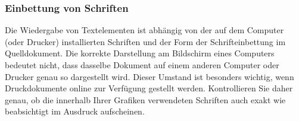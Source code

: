 \subsubsection{Einbettung von Schriften}

Die Wiedergabe von Textelementen ist abhängig von der auf dem
Computer (oder Drucker) installierten Schriften und der Form der
Schrifteinbettung im Quelldokument. Die korrekte Darstellung am
Bildschirm eines Computers bedeutet nicht, dass dasselbe Dokument
auf einem anderen Computer oder Drucker genau so dargestellt wird.
Dieser Umstand ist besonders wichtig, wenn Druckdokumente online
zur Verfügung gestellt werden. Kontrollieren Sie daher genau, ob
die innerhalb Ihrer Grafiken verwendeten Schriften auch exakt wie
beabsichtigt im Ausdruck aufscheinen.

